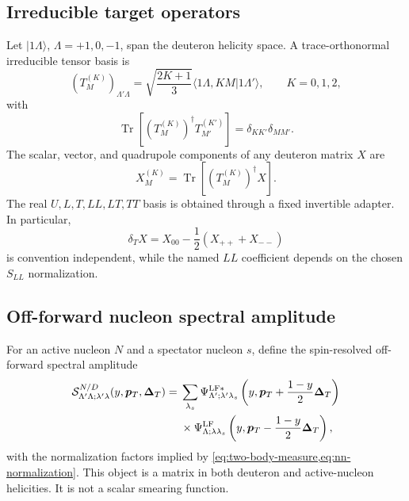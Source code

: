 \documentclass[11pt]{article}
\newcommand{\pT}{\bm{p}_{T}}
\newcommand{\DT}{\bm{\Delta}_{T}}
\newcommand{\Tr}{\operatorname{Tr}}
\newcommand{\LF}{\mathrm{LF}}
\newcommand{\cS}{\mathcal S}
\begin{document}
\subsection{Irreducible target operators}

Let \(|1\Lambda\rangle\), \(\Lambda=+1,0,-1\), span the deuteron helicity
space.  A trace-orthonormal irreducible tensor basis is
\begin{equation}
 \left(T_M^{(K)}\right)_{\Lambda'\Lambda}
 =\sqrt{\frac{2K+1}{3}}
 \langle 1\Lambda,KM|1\Lambda'\rangle,
 \qquad
 K=0,1,2,
\label{eq:spin1-irrep-basis}
\end{equation}
with
\begin{equation}
 \Tr\left[
 (T_M^{(K)})^\dagger T_{M'}^{(K')}
 \right]
 =\delta_{KK'}\delta_{MM'}.
\label{eq:spin1-irrep-orthogonality}
\end{equation}
The scalar, vector, and quadrupole components of any deuteron matrix \(X\) are
\begin{equation}
 X_M^{(K)}=\Tr[(T_M^{(K)})^\dagger X].
\label{eq:spin1-irrep-coefficients}
\end{equation}
The real \(U,L,T,LL,LT,TT\) basis is obtained through a fixed invertible
adapter.  In particular,
\begin{equation}
 \delta_T X
 =X_{00}-\frac12(X_{++}+X_{--})
\label{eq:tensor-helicity-difference}
\end{equation}
is convention independent, while the named \(LL\) coefficient depends on the
chosen \(S_{LL}\) normalization.

\subsection{Off-forward nucleon spectral amplitude}

For an active nucleon \(N\) and a spectator nucleon \(s\), define the
spin-resolved off-forward spectral amplitude
\begin{align}
 \cS_{\Lambda'\Lambda;\lambda'\lambda}^{N/D}
 (y,\pT,\DT)
 ={}&
 \sum_{\lambda_s}
 \Psi_{\Lambda';\lambda'\lambda_s}^{\LF *}
 \left(y,\pT+\frac{1-y}{2}\DT\right)
 \notag\\
 &\times
 \Psi_{\Lambda;\lambda\lambda_s}^{\LF}
 \left(y,\pT-\frac{1-y}{2}\DT\right),
\label{eq:offforward-spectral-amplitude}
\end{align}
with the normalization factors implied by
\cref{eq:two-body-measure,eq:nn-normalization}.  This object is a matrix in
both deuteron and active-nucleon helicities.  It is not a scalar smearing
function.
\end{document}
